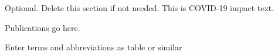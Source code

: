 







\begin{uomcovid} %
  Optional. Delete this section if not needed. This is COVID-19 impact text.
  
  \lipsum[1-3] %
\end{uomcovid}%




\makeatletter
\title{\xmp@Title}
\author{\xmp@Author}
\makeatother

\maketitle




\uomtoc %
\uomlof %
\uomlot %
\begin{uomlop} %
  Publications go here.
\end{uomlop}
\begin{uomterms}
  Enter terms and abbreviations as table or similar
\end{uomterms}




